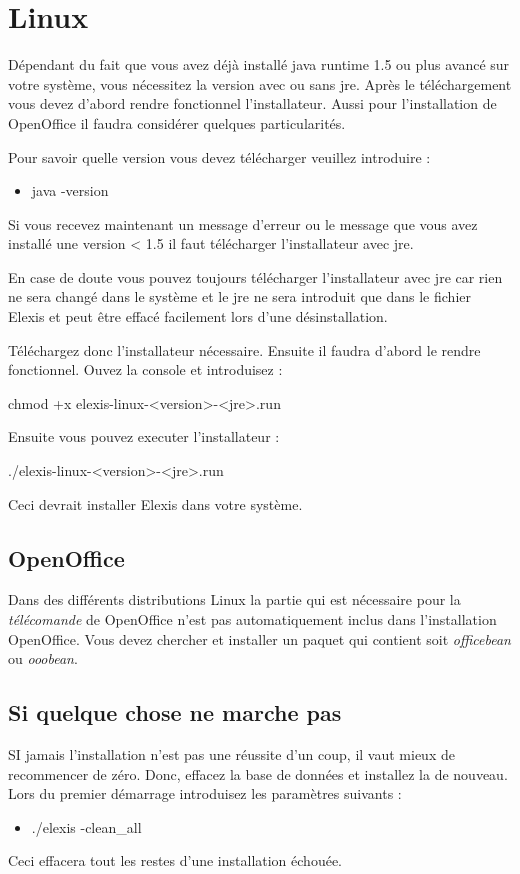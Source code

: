 \section{Linux}
Dépendant du fait que vous avez déjà installé java runtime 1.5 ou plus avancé sur votre système, vous nécessitez la version avec ou sans jre. Après le téléchargement vous devez d'abord rendre fonctionnel l'installateur. Aussi pour l'installation de OpenOffice il faudra considérer quelques particularités.

Pour savoir quelle version vous devez télécharger veuillez introduire : 
\begin{itemize}
\item java -version
\end{itemize}

Si vous recevez maintenant un message d'erreur ou le message que vous avez installé une version < 1.5 il faut télécharger l'installateur avec jre.


En case de doute vous pouvez toujours télécharger l'installateur avec jre car rien ne sera changé dans le système et le jre ne sera introduit que dans le fichier Elexis et peut être effacé facilement lors d'une désinstallation.


Téléchargez donc l'installateur nécessaire. Ensuite il faudra d'abord le rendre fonctionnel. Ouvez la console et introduisez :

chmod +x elexis-linux-<version>-<jre>.run

 Ensuite vous pouvez executer l'installateur :

./elexis-linux-<version>-<jre>.run

Ceci devrait installer Elexis dans votre système.

\subsection{OpenOffice}
Dans des différents distributions Linux la partie qui est nécessaire pour la \textit{télécomande} de OpenOffice n'est pas automatiquement inclus dans l'installation OpenOffice. Vous devez chercher et installer un paquet qui contient soit \textit{officebean}  ou \textit{ooobean}.

\subsection{Si quelque chose ne marche pas}
SI jamais l'installation n'est pas une réussite d'un coup, il vaut mieux de recommencer de zéro. Donc, effacez la base de données et installez la de nouveau. Lors du premier démarrage introduisez les paramètres suivants :
\begin{itemize}
 \item ./elexis -clean\_all
\end{itemize}
Ceci effacera tout les restes d'une installation échouée.

